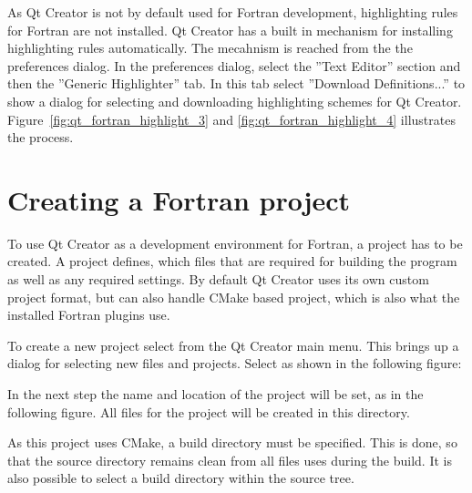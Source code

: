 As Qt Creator is not by default used for Fortran development, highlighting rules for Fortran are not installed. Qt Creator has a built in mechanism for installing highlighting rules automatically. The mecahnism is reached from the the preferences dialog. In the preferences dialog, select the ''Text Editor'' section and then the ''Generic Highlighter'' tab. In this tab select ''Download Definitions...'' to show a dialog for selecting and downloading highlighting schemes for Qt Creator. Figure~\ref{fig:qt_fortran_highlight_3} and \ref{fig:qt_fortran_highlight_4} illustrates the process.


\section{Creating a Fortran project}

To use Qt Creator as a development environment for Fortran, a project has to be created. A project defines, which files that are required for building the program as well as any required settings. By default Qt Creator uses its own custom project format, but can also handle CMake based project, which is also what the installed Fortran plugins use. 

To create a new project select  from the Qt Creator main menu. This brings up a dialog for selecting new files and projects. Select  as shown in the following figure:


In the next step the name and location of the project will be set, as in the following figure. All files for the project will be created in this directory.


As this project uses CMake, a build directory must be specified. This is done, so that the source directory remains clean from all files uses during the build. It is also possible to select a build directory within the source tree. 

